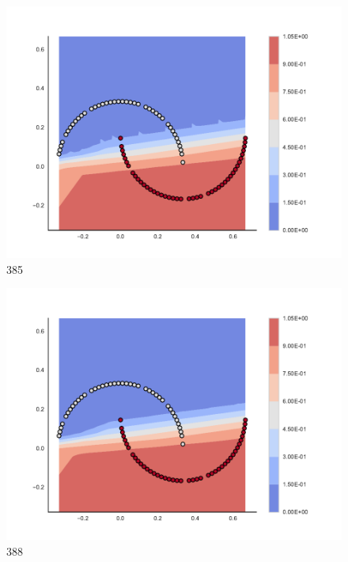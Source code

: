 \begin{subfigure}[b]{0.09\textwidth}
    \includegraphics[clip, trim=2.35cm 1.75cm 4.5cm 0cm,width=\textwidth]{img/convergence/385.pdf}
    \caption{385}
    \label{fig:convergence_385}
\end{subfigure}
%
\begin{subfigure}[b]{0.09\textwidth}
    \includegraphics[clip, trim=2.35cm 1.75cm 4.5cm 0cm,width=\textwidth]{img/convergence/388.pdf}
    \caption{388}
    \label{fig:convergence_388}
\end{subfigure}
%
